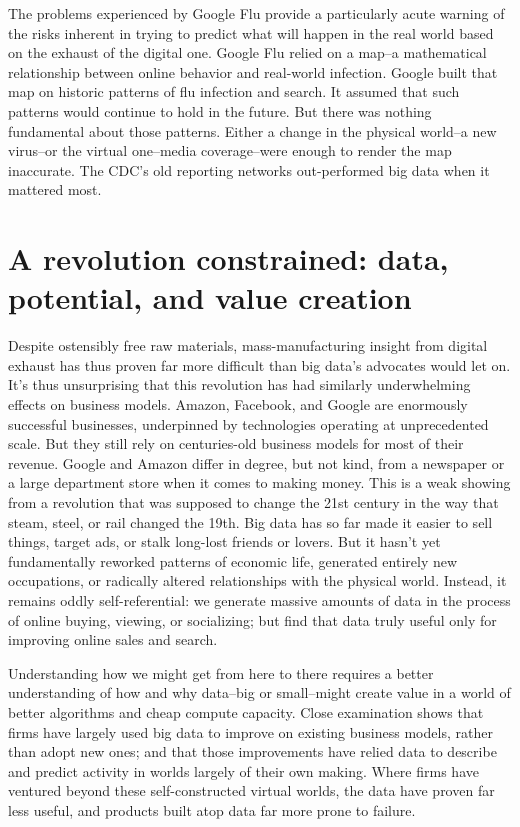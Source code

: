 \documentclass[12pt]{article}
\begin{document}
The problems experienced by Google Flu provide a particularly acute
warning of the risks inherent in trying to predict what will happen in
the real world based on the exhaust of the digital one. Google Flu
relied on a map--a mathematical relationship between online behavior
and real-world infection. Google built that map on historic patterns
of flu infection and search. It assumed that such patterns would
continue to hold in the future. But there was nothing fundamental
about those patterns. Either a change in
the physical world--a new virus--or the virtual one--media
coverage--were enough to render the map inaccurate. The CDC's old
reporting networks out-performed big data when it mattered most.



\section{A revolution constrained: data, potential, and value creation}
\label{sec:but-what-can}

Despite ostensibly free raw materials, mass-manufacturing insight from
digital exhaust has thus proven far more difficult than big data's
advocates would let on. It's thus unsurprising that this revolution
has had similarly underwhelming effects on business models. Amazon,
Facebook, and Google are enormously successful businesses, underpinned
by technologies operating at unprecedented scale. But they still rely
on centuries-old business models for most of their revenue. Google and
Amazon differ in degree, but not kind, from a newspaper or a large
department store when it comes to making money. This is a weak showing
from a revolution that was supposed to change the 21st century in the
way that steam, steel, or rail changed the 19th. Big data has so far
made it easier to sell things, target ads, or stalk long-lost friends
or lovers. But it hasn't yet fundamentally reworked patterns of
economic life, generated entirely new occupations, or radically
altered relationships with the physical world. Instead, it remains
oddly self-referential: we generate massive amounts of data in the
process of online buying, viewing, or socializing; but find that data
truly useful only for improving online sales and search.

Understanding how we might get from here to there requires a better
understanding of how and why data--big or small--might create value in
a world of better algorithms and cheap compute capacity. Close
examination shows that firms have largely used big data to improve on
existing business models, rather than adopt new ones; and that those
improvements have relied data to describe and predict activity in
worlds largely of their own making. Where firms have ventured beyond
these self-constructed virtual worlds, the data have proven far less
useful, and products built atop data far more prone to failure. 
\end{document}

